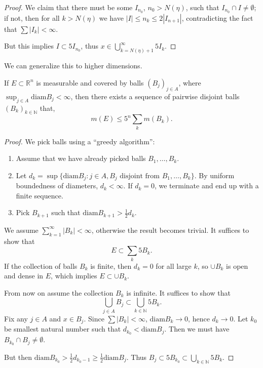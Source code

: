 \begin{proof}
	We claim that there must be some $I_{n_0}$, $n_0 > N(\eta)$, such that $I_{n_0} \cap I \neq \emptyset $; if not, then for all $k > N(\eta)$ we have $|I| \le n_k \le 2 |I_{n + 1}|$, contradicting the fact that $\sum |I_k| < \infty $. 

	But this implies $I \subset 5 I_{n_0}$, thus $x \in \bigcup_{k = N(\eta) + 1} ^{\infty } 5 I_k$.
\end{proof}

We can generalize this to higher dimensions.

\begin{theorem}
	\label{thm:WienerCoveringLem}

	If $E \subset \mathbb{R}^n$ is measurable and covered by balls $(B_j)_{j \in A}$, where $\sup _{j \in A} \text{diam} B_j < \infty $, then there exists a sequence of pairwise disjoint balls $(B_k)_{k \in \mathbb{N}}$ that,
	\[
		m(E) \le 5^n \sum_k m(B_k)
	.\] 
\end{theorem}
\begin{proof}
	We pick balls using a ``greedy algorithm'':
	\begin{enumerate}
		\item Assume that we have already picked balls $B_1, \ldots, B_k$.
		\item Let $d_k = \sup \{\text{diam}B_j: j \in A, B_j \text{ disjoint from } B_1, \ldots, B_k\} $. By uniform boundedness of diameters,  $d_k < \infty $. If $d_k = 0$, we terminate and end up with a finite sequence.
		\item Pick $B_{k + 1}$ such that $\text{diam} B_{k + 1} > \frac{1}{2} d_k$. 
	\end{enumerate}
	We assume $\sum_{k = 1}^\infty |B_k| < \infty $, otherwise the result becomes trivial. It suffices to show that
	\[
		E \subset \sum_k 5 B_k
	.\] 
	If the collection of balls $B_k$ is finite, then $d_k = 0$ for all large $k$, so $\cup B_k$ is open and dense in $E$, which implies $E \subset \cup B_k$.

	From now on assume the collection $B_k$ is infinite. It suffices to show that
	\[
		\bigcup_{j \in A} B_j \subset \bigcup_{k \in \mathbb{N}}  5 B_k
	.\] 
	Fix any $j \in A$ and $x \in B_j$. Since $\sum |B_k| < \infty $, $\text{diam} B_k \to 0$, hence $d_k \to  0$. Let $k_0$ be smallest natural number such that $d_{k_0} < \text{diam} B_j$. Then we must have $B_{k_0} \cap B_{j}\neq \emptyset $. 

	But then $\text{diam}B_{k_0} > \frac{1}{2} d_{k_0 - 1} \ge \frac{1}{2} \text{diam} B_j$. Thus $B_j \subset 5 B_{k_0} \subset \bigcup_{k \in \mathbb{N}}  5 B_k$.
\end{proof}

